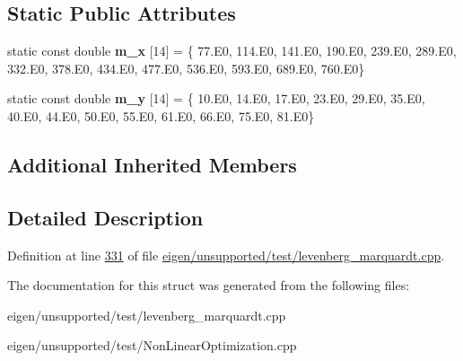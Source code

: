 \subsection*{Static Public Attributes}
\begin{DoxyCompactItemize}
\item 
\mbox{\label{structmisra1a__functor_a6e710eb6e22ea201ea3091a9c736535f}} 
static const double {\bfseries m\+\_\+x} \mbox{[}14\mbox{]} = \{ 77.\+E0, 114.\+E0, 141.\+E0, 190.\+E0, 239.\+E0, 289.\+E0, 332.\+E0, 378.\+E0, 434.\+E0, 477.\+E0, 536.\+E0, 593.\+E0, 689.\+E0, 760.\+E0\}
\item 
\mbox{\label{structmisra1a__functor_a3ce193a335781797de06d57838149107}} 
static const double {\bfseries m\+\_\+y} \mbox{[}14\mbox{]} = \{ 10.\+E0, 14.\+E0, 17.\+E0, 23.\+E0, 29.\+E0, 35.\+E0, 40.\+E0, 44.\+E0, 50.\+E0, 55.\+E0, 61.\+E0, 66.\+E0, 75.\+E0, 81.\+E0\}
\end{DoxyCompactItemize}
\subsection*{Additional Inherited Members}


\subsection{Detailed Description}


Definition at line \hyperlink{eigen_2unsupported_2test_2levenberg__marquardt_8cpp_source_l00331}{331} of file \hyperlink{eigen_2unsupported_2test_2levenberg__marquardt_8cpp_source}{eigen/unsupported/test/levenberg\+\_\+marquardt.\+cpp}.



The documentation for this struct was generated from the following files\+:\begin{DoxyCompactItemize}
\item 
eigen/unsupported/test/levenberg\+\_\+marquardt.\+cpp\item 
eigen/unsupported/test/\+Non\+Linear\+Optimization.\+cpp\end{DoxyCompactItemize}
